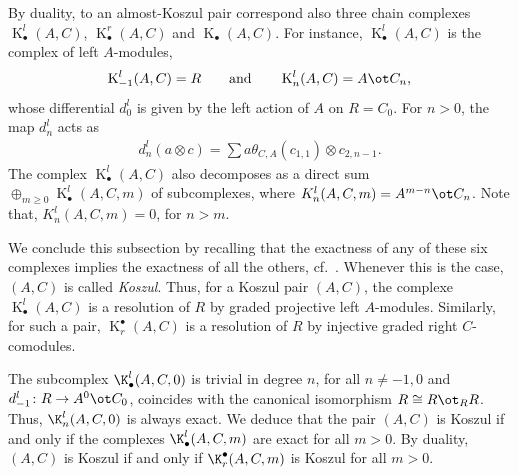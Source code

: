 By duality, to an almost-Koszul pair correspond also three chain complexes $\operatorname{K}^l_\bullet\!(A{,}C)$, $\operatorname{K}^r_\bullet\!(A{,}C)$ and $\operatorname{K}_\bullet(A,C)$. For instance, $\operatorname{K}^l_\bullet(A,C)$ is the complex of left $A$-modules,
\begin{gather*} \operatorname{K}_{-1}^l(A,C)=R \qquad \text{and} \qquad \operatorname{K}^l_n(A,C)=A \ot C_n,\end{gather*}
whose dif\/ferential $d_{0}^l$ is given by the left action of $A$ on $R=C_0$. For $n > 0$, the map $d_n^l$ acts as
\begin{gather*}
	d_{n}^{l}(a\otimes c)=\sum\limits a\theta _{C,A}(c_{1,{1}})\otimes c_{2,{n-1}}.
\end{gather*}
The complex $\operatorname{K}_\bullet^l(A,C)$ also decomposes as a direct sum $\oplus_{m\geq 0}\operatorname{K}^l_\bullet(A,C,m)$ of subcomplexes, where ${K}^l_n(A,C,m)=A^{m-n}\ot C_n$. Note that, ${K}^l_n(A,C,m)=0$, for $n>m$.

We conclude this subsection by recalling that the exactness of any of these six complexes implies the exactness of all the others, cf.\ \cite[Theorem~2.3]{jps}. Whenever this is the case, $(A,C)$ is called \emph{Koszul}. Thus, for a Koszul pair $(A,C)$, the complexe $\operatorname{K}_\bullet^l(A,C)$ is a resolution of $R$ by graded projective left $A$-modules. Similarly, for such a pair, $\operatorname{K}^\bullet_r(A,C)$ is a resolution of $R$ by injective graded right $C$-comodules.

The subcomplex $\K_\bullet^l(A,C,0)$ is trivial in degree $n$, for all $n\neq -1,0$ and $d_{-1}^l\colon R\to A^0\ot C_0$, coincides with the canonical isomorphism $R\cong R\ot_R R$. Thus, $\K_n^l(A,C,0)$ is always exact. We deduce that the pair $(A,C)$ is Koszul if and only if the complexes $\K_\bullet^l(A,C,m)$ are exact for all $m>0$. By duality, $(A,C)$ is Koszul if and only if $\K^\bullet_r(A,C,m)$ is Koszul for all $m>0$.

